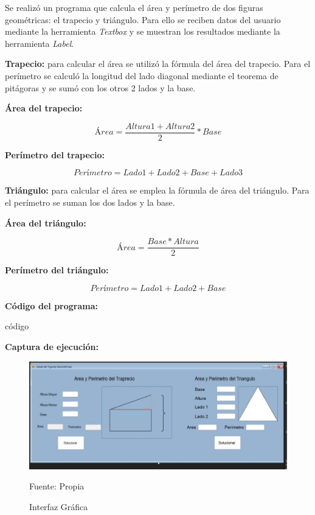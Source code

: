 Se realizó un programa que calcula el área y perímetro de dos figuras geométricas: el trapecio y triángulo. Para ello se reciben datos del usuario mediante la herramienta \emph{Textbox} y se muestran los resultados mediante la herramienta \emph{Label}.

\textbf{Trapecio:} para calcular el área se utilizó la fórmula del área del trapecio. Para el perímetro se calculó la longitud del lado diagonal mediante el teorema de pitágoras y se sumó con los otros 2 lados y la base.

\textbf{Área del trapecio:}

\begin{equation*}
  Área = \frac{Altura 1 + Altura 2}{2} * Base
\end{equation*}

\textbf{Perímetro del trapecio:}

\begin{equation*}
  Perímetro = Lado1 + Lado2 + Base + Lado3
\end{equation*}

\textbf{Triángulo:} para calcular el área se emplea la fórmula de área del triángulo. Para el perímetro se suman los dos lados y la base.

\textbf{Área del triángulo:}

\begin{equation*}
  Área = \frac{Base * Altura}{2}
\end{equation*}

\textbf{Perímetro del triángulo:}

\begin{equation*}
  Perímetro = Lado1 + Lado2 + Base
\end{equation*}

\textbf{Código del programa:}

código

\textbf{Captura de ejecución:}

\begin{figure}[H]
  \centering
  \includegraphics[scale = 0.5]{Imagenes/interfaz_grafica.jpeg}
  \caption{Interfaz Gráfica}{Fuente: Propia}
\end{figure}